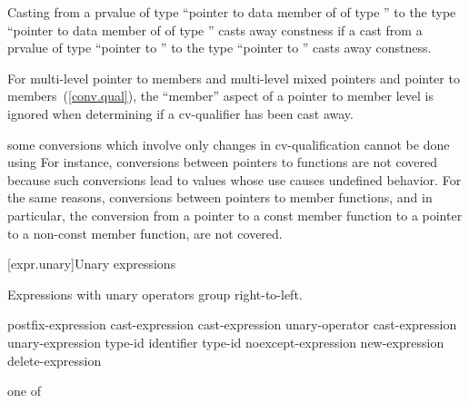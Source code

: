 \pnum
Casting from a prvalue of type ``pointer to data member of  of
type '' to the type ``pointer to data member of  of
type '' casts away constness if a cast from a prvalue of type
``pointer to '' to the type ``pointer to '' casts
away constness.

\pnum
For multi-level pointer to members and multi-level mixed pointers and
pointer to members~(\ref{conv.qual}), the ``member'' aspect of a pointer
to member level is ignored when determining if a 
cv-qualifier has been cast away.

\pnum
\enternote 
some conversions which involve only changes in cv-qualification cannot
be done using  For instance, conversions between
pointers to functions are not covered because such conversions lead to
values whose use causes undefined behavior. For the same reasons,
conversions between pointers to member functions, and in particular, the
conversion from a pointer to a const member function to a pointer to a
non-const member function, are not covered.
\exitnote%

[expr.unary]{Unary expressions}

\pnum
{}%
Expressions with unary operators group right-to-left.

%
%
%
%
%
\begin{bnf}
\br
    postfix-expression\br
    \terminal{++} cast-expression\br
    \terminal{-{-}} cast-expression\br
    unary-operator cast-expression\br
     unary-expression\br
     type-id \terminal{)}\br
     \terminal{(} identifier \terminal{)}\br
     type-id \terminal{)}\br
    noexcept-expression\br
    new-expression\br
    delete-expression
\end{bnf}

%
%
%
%
%
%
%
%
%
%
%
%
%
%
%
\begin{bnf}
 \textnormal{one of}\br
    \terminal{*  \&  +  -  !  \tilde}
\end{bnf}

